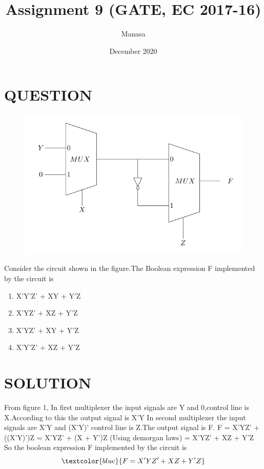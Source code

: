 \documentclass{report}
\title{Assignment 9 (GATE, EC 2017-16)}
\author{Manasa}
\date{December 2020}
\begin{document}
\maketitle
\section{QUESTION}
\begin{figure}[htp]
        \centering
        \includegraphics[width=17cm]{Figure.pdf}
         \caption{}
        \label{fig:ok}
\end{figure}
\huge
Consider the circuit shown in the figure.The Boolean expression F implemented by the circuit is

 \begin{enumerate}
 \item X'Y'Z' + XY + Y'Z
\item X'YZ' + XZ + Y'Z
\item X'YZ' + XY + Y'Z
\item X'Y'Z' + XZ + Y'Z
  \end{enumerate}



\section{SOLUTION}
From figure 1,
\newline 
In first multiplexer the input signals are Y and 0,control line is X.According to this the output signal is X'Y
\newline
In second multiplexer the input signals are X'Y and (X'Y)' control line is Z.The output signal is F.
\newline
\newline
F = X'YZ' + ((X'Y)')Z
\newline
\newline
  = X'YZ' + (X + Y')Z   \hspace{3}       (Using demorgan laws)
\newline\newline
= X'YZ' + XZ + Y'Z 
\newline
So the boolean expression F implemented by the circuit is
\newline
\begin{equation}
   \textcolor{blue}{F = X'YZ'+XZ+Y'Z}
\end{equation}
 
\end{document}
